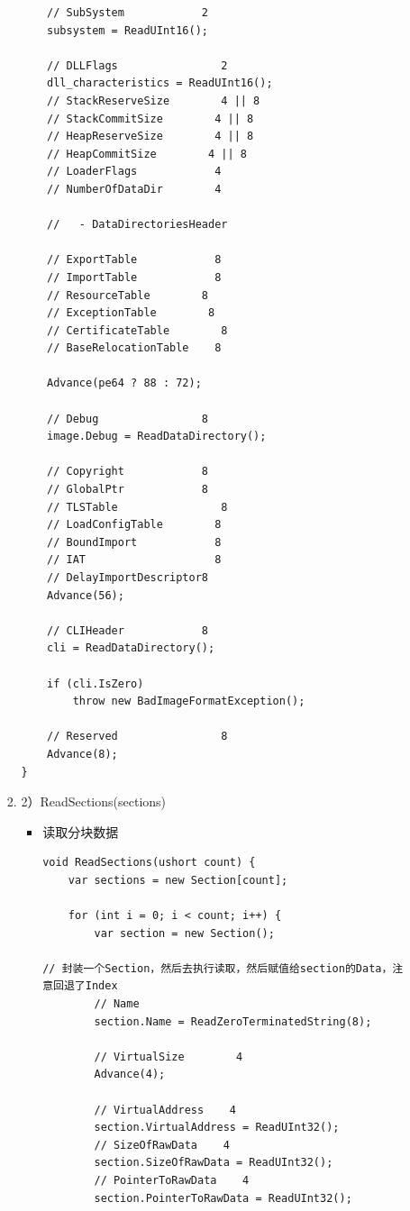\documentclass[9pt, b5paper]{article}
\begin{document}
\begin{enumerate}
\begin{enumerate}
\begin{enumerate}
\begin{verbatim}
    // SubSystem            2
    subsystem = ReadUInt16();

    // DLLFlags                2
    dll_characteristics = ReadUInt16();
    // StackReserveSize        4 || 8
    // StackCommitSize        4 || 8
    // HeapReserveSize        4 || 8
    // HeapCommitSize        4 || 8
    // LoaderFlags            4
    // NumberOfDataDir        4

    //   - DataDirectoriesHeader

    // ExportTable            8
    // ImportTable            8
    // ResourceTable        8
    // ExceptionTable        8
    // CertificateTable        8
    // BaseRelocationTable    8

    Advance(pe64 ? 88 : 72);

    // Debug                8
    image.Debug = ReadDataDirectory();

    // Copyright            8
    // GlobalPtr            8
    // TLSTable                8
    // LoadConfigTable        8
    // BoundImport            8
    // IAT                    8
    // DelayImportDescriptor8
    Advance(56);

    // CLIHeader            8
    cli = ReadDataDirectory();

    if (cli.IsZero)
        throw new BadImageFormatException();

    // Reserved                8
    Advance(8);
}
\end{verbatim}
\item 2）ReadSections(sections)
\label{sec-9-1-3-1-3-2}
\begin{itemize}
\item 读取分块数据
\begin{verbatim}
void ReadSections(ushort count) {
    var sections = new Section[count];

    for (int i = 0; i < count; i++) {
        var section = new Section();

// 封装一个Section，然后去执行读取，然后赋值给section的Data，注意回退了Index        
        // Name
        section.Name = ReadZeroTerminatedString(8);

        // VirtualSize        4
        Advance(4);

        // VirtualAddress    4
        section.VirtualAddress = ReadUInt32();
        // SizeOfRawData    4
        section.SizeOfRawData = ReadUInt32();
        // PointerToRawData    4
        section.PointerToRawData = ReadUInt32();


\end{verbatim}
\end{itemize}
\end{enumerate}
\end{enumerate}
\end{enumerate}
\end{document}
